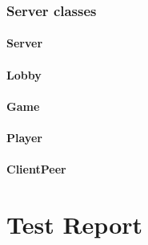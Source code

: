 \documentclass[12pt, letterpaper]{article}
\begin{document}

    \subsubsection{Server classes}


    \paragraph{Server}

    \paragraph{Lobby}

    \paragraph{Game}

    \paragraph{Player}

    \paragraph{ClientPeer}


    \section{Test Report}


\end{document}
